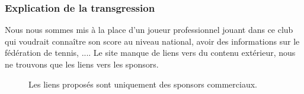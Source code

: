 \documentclass{article}[12pt]
\begin{document}
    \subsubsection*{Explication de la transgression}
    Nous nous sommes mis à la place d'un joueur professionnel jouant dans ce club qui voudrait connaître son score au niveau national, avoir des informations sur le fédération de tennis, .... Le site manque de liens vers du contenu extérieur, nous ne trouvons que les liens vers les sponsors.
        \begin{figure}[H]
        	\centering
        	\caption{Les liens proposés sont uniquement des sponsors commerciaux.}
        \end{figure}
    
\end{document}
